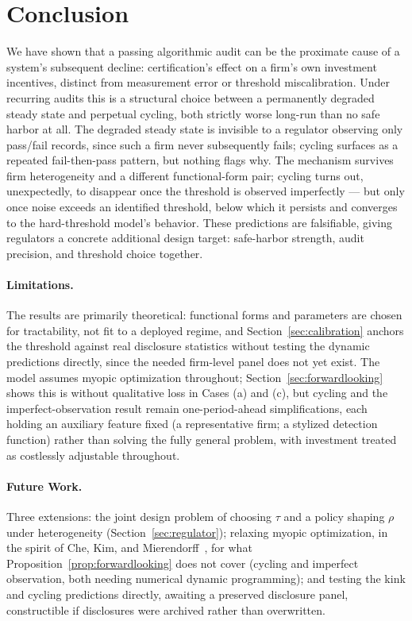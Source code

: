 \section{Conclusion}

We have shown that a passing algorithmic audit can be the proximate cause of a system's subsequent decline: certification's effect on a firm's own investment incentives, distinct from measurement error or threshold miscalibration. Under recurring audits this is a structural choice between a permanently degraded steady state and perpetual cycling, both strictly worse long-run than no safe harbor at all. The degraded steady state is invisible to a regulator observing only pass/fail records, since such a firm never subsequently fails; cycling surfaces as a repeated fail-then-pass pattern, but nothing flags why. The mechanism survives firm heterogeneity and a different functional-form pair; cycling turns out, unexpectedly, to disappear once the threshold is observed imperfectly — but only once noise exceeds an identified threshold, below which it persists and converges to the hard-threshold model's behavior. These predictions are falsifiable, giving regulators a concrete additional design target: safe-harbor strength, audit precision, and threshold choice together.

\paragraph{Limitations.} The results are primarily theoretical: functional forms and parameters are chosen for tractability, not fit to a deployed regime, and Section~\ref{sec:calibration} anchors the threshold against real disclosure statistics without testing the dynamic predictions directly, since the needed firm-level panel does not yet exist. The model assumes myopic optimization throughout; Section~\ref{sec:forwardlooking} shows this is without qualitative loss in Cases (a) and (c), but cycling and the imperfect-observation result remain one-period-ahead simplifications, each holding an auxiliary feature fixed (a representative firm; a stylized detection function) rather than solving the fully general problem, with investment treated as costlessly adjustable throughout.

\paragraph{Future Work.} Three extensions: the joint design problem of choosing $\tau$ and a policy shaping $\rho$ under heterogeneity (Section~\ref{sec:regulator}); relaxing myopic optimization, in the spirit of Che, Kim, and Mierendorff~\cite{che2024datadriven}, for what Proposition~\ref{prop:forwardlooking} does not cover (cycling and imperfect observation, both needing numerical dynamic programming); and testing the kink and cycling predictions directly, awaiting a preserved disclosure panel, constructible if disclosures were archived rather than overwritten.
